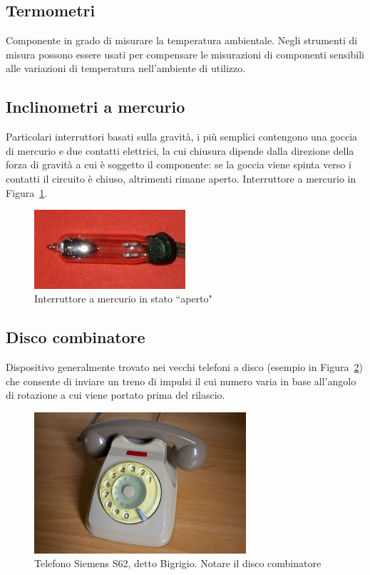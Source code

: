 \documentclass[12pt,a4paper]{report}
\begin{document}
\subsection{Termometri}
Componente in grado di misurare la temperatura ambientale. Negli strumenti di misura possono essere usati per compensare le misurazioni
di componenti sensibili alle variazioni di temperatura nell'ambiente di utilizzo.
\subsection{Inclinometri a mercurio}
Particolari interruttori basati sulla gravità, i più semplici contengono una goccia di mercurio e due contatti elettrici, la cui chiusura dipende dalla
direzione della forza di gravità a cui è soggetto il componente: se la goccia viene spinta verso i contatti il circuito è chiuso, altrimenti rimane aperto.
Interruttore a mercurio in Figura~\ref{fig:mercuryswitch}.

\begin{figure}[h]
  \centering
  \includegraphics[width=0.5\textwidth]{mercuryswitch}
  \caption{Interruttore a mercurio in stato ``aperto" \cite{wiki:mercuryswitch}}
  \label{fig:mercuryswitch}
\end{figure}

\subsection{Disco combinatore}
Dispositivo generalmente trovato nei vecchi telefoni a disco (esempio in Figura~\ref{fig:siemenss62}) che consente di inviare un
treno di impulsi il cui numero varia in base all'angolo di rotazione a cui viene portato prima del rilascio.

\begin{figure}[h]
  \centering
  \includegraphics[width=0.7\textwidth]{siemenss62}
  \caption{Telefono Siemens S62, detto Bigrigio. Notare il disco combinatore \cite{wiki:siemenss62}}
  \label{fig:siemenss62}
\end{figure}
\end{document}
